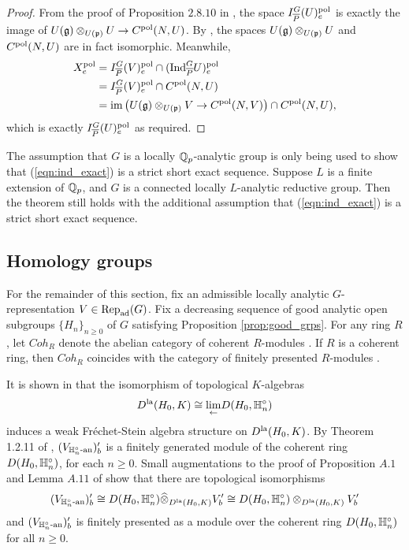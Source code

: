 \documentclass[10pt]{amsart}
\begin{document}
\begin{proof}
From the proof of Proposition $2.8.10$ in \cite{Jacquet2}, the space $I_{\overline{P}}^{G}(U)_{e}^{\textnormal{pol}} $ is exactly the image of $U(\mathfrak{g})\otimes_{U(\mathfrak{p})}U\rightarrow C^{\textnormal{pol}}(N,U)$. By \cite[Prop. 3.26]{Bergall_Chojecki}, the spaces $U(\mathfrak{g})\otimes_{U(\mathfrak{p})}U$ and $C^{\textnormal{pol}}(N,U)$ are in fact isomorphic. Meanwhile, \begin{equation}\begin{split}
    X_{e}^{\textnormal{pol}}	& = I_{\overline{P}}^{G}(V)_{e}^{\textnormal{pol}}\cap(\textnormal{Ind}_{\overline{P}}^{G}U)_{e}^{\textnormal{pol}} \\
	& =	I_{\overline{P}}^{G}(V)_{e}^{\textnormal{pol}}\cap C^{\textnormal{pol}}(N,U) \\
	&=	\textnormal{im}\left(U(\mathfrak{g})\otimes_{U(\mathfrak{p})}V\rightarrow C^{\textnormal{pol}}(N,V)\right)\cap C^{\textnormal{pol}}(N,U),
\end{split}\end{equation} which is exactly $I_{\overline{P}}^{G}(U)_{e}^{\textnormal{pol}}$ as required. 
\end{proof}

\begin{remark}
The assumption that $G$ is a locally $\mathbb{Q}_{p}$-analytic group is only being used to show that (\ref{eqn:ind_exact}) is a strict short exact sequence. Suppose $L$ is a finite extension of $\mathbb{Q}_{p}$, and $G$ is a connected locally $L$-analytic reductive group. Then the theorem still holds with the additional assumption that (\ref{eqn:ind_exact}) is a strict short exact sequence. 
\end{remark}

\subsection{Homology groups}

For the remainder of this section, fix an admissible locally analytic $G$-representation $V\in \textnormal{Rep}_{\textnormal{ad}}(G)$. Fix a decreasing sequence of good analytic open subgroups $\{H_{n}\}_{n\geq 0}$ of $G$ satisfying Proposition \ref{prop:good_grps}. For any ring $R$, let $Coh_{R}$ denote the abelian category of coherent $R$-modules \cite[Thm. 2.3]{Swan}. If $R$ is a coherent ring, then $Coh_{R}$ coincides with the category of finitely presented $R$-modules \cite[Cor. 2.7]{Swan}.

It is shown in \cite[Prop. 5.3.1]{analytic} that the isomorphism of topological $K$-algebras \[
    D^{\textnormal{la}}(H_{0},K)\cong \underset{\leftarrow}{\lim}D(H_{0},\mathbb{H}_{n}^{\circ})
\] induces a weak Fr\'{e}chet-Stein algebra structure on $D^{\textnormal{la}}(H_{0},K)$. By Theorem 1.2.11 of \cite{analytic}, $(V_{\mathbb{H}_{n}^{\circ}\textnormal{-an}})^{\prime}_{b}$ is a finitely generated module of the coherent ring $D(H_{0},\mathbb{H}_{n}^{\circ})$, for each $n\geq 0$. Small augmentations to the proof of Proposition $A.1$ and Lemma $A.11$ of \cite{Jacquet2} show that there are topological isomorphisms \begin{equation} \label{eqn:D(Hn)V}
    (V_{\mathbb{H}_{n}^{\circ}\textnormal{-an}})^{\prime}_{b}\cong D(H_{0},\mathbb{H}_{n}^{\circ})\widehat{\otimes}_{D^{\textnormal{la}}(H_{0},K)}V^{\prime}_{b} \cong D(H_{0},\mathbb{H}_{n}^{\circ})\otimes_{D^{\textnormal{la}}(H_{0},K)}V^{\prime}_{b}
\end{equation}
and $(V_{\mathbb{H}_{n}^{\circ}\textnormal{-an}})^{\prime}_{b}$ is finitely presented as a module over the coherent ring $D(H_{0},\mathbb{H}_{n}^{\circ})$ for all $n\geq 0$. 
\end{document}
